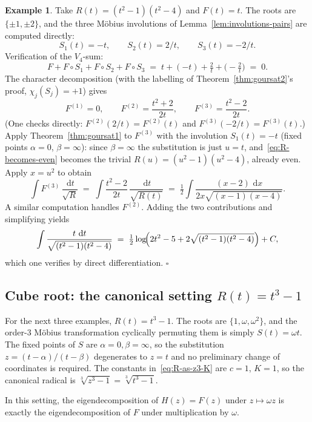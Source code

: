 \documentclass[11pt,a4paper]{article}
\theoremstyle{plain}
\theoremstyle{definition}
\newtheorem{example}[theorem]{Example}
\theoremstyle{remark}
\renewcommand{\d}{\,\mathrm{d}}
\begin{document}
\begin{example}\label{ex:goursat-basic}
Take $R(t) = (t^2-1)(t^2-4)$ and $F(t)=t$. The roots are $\{\pm 1, \pm 2\}$, and the three M\"obius involutions of Lemma~\ref{lem:involutions-pairs} are computed directly:
\[
  S_1(t) = -t,\qquad S_2(t) = 2/t,\qquad S_3(t) = -2/t.
\]
Verification of the $V_4$-sum:
\[
  F + F\!\circ\! S_1 + F\!\circ\! S_2 + F\!\circ\! S_3 \;=\; t + (-t) + \tfrac{2}{t} + \bigl(-\tfrac{2}{t}\bigr) \;=\; 0.
\]
The character decomposition (with the labelling of Theorem~\ref{thm:goursat2}'s proof, $\chi_j(S_j)=+1$) gives
\[
  F^{(1)} = 0,\qquad F^{(2)} = \frac{t^2+2}{2t},\qquad F^{(3)} = \frac{t^2-2}{2t}.
\]
(One checks directly: $F^{(2)}(2/t) = F^{(2)}(t)$ and $F^{(3)}(-2/t) = F^{(3)}(t)$.) Apply Theorem~\ref{thm:goursat1} to $F^{(3)}$ with the involution $S_1(t)=-t$ (fixed points $\alpha=0$, $\beta=\infty$): since $\beta=\infty$ the substitution is just $u=t$, and~\eqref{eq:R-becomes-even} becomes the trivial $R(u) = (u^2-1)(u^2-4)$, already even. Apply $x = u^2$ to obtain
\[
  \int F^{(3)}\,\frac{\d t}{\sqrt{R}} \;=\; \int \frac{t^2-2}{2t}\,\frac{\d t}{\sqrt{R(t)}}
  \;=\; \tfrac{1}{2}\int \frac{(x-2)\,\d x}{2x\sqrt{(x-1)(x-4)}}.
\]
A similar computation handles $F^{(2)}$. Adding the two contributions and simplifying yields
\[
  \int \frac{t\,\d t}{\sqrt{(t^2-1)(t^2-4)}} \;=\; \tfrac{1}{2}\log\!\Bigl(2t^2 - 5 + 2\sqrt{(t^2-1)(t^2-4)}\Bigr) + C,
\]
which one verifies by direct differentiation. \hfill$\square$
\end{example}

\subsection{Cube root: the canonical setting $R(t)=t^3-1$}

For the next three examples, $R(t)=t^3-1$. The roots are $\{1,\omega,\omega^2\}$, and the order-$3$ M\"obius transformation cyclically permuting them is simply $S(t) = \omega t$. The fixed points of $S$ are $\alpha=0,\beta=\infty$, so the substitution $z=(t-\alpha)/(t-\beta)$ degenerates to $z=t$ and no preliminary change of coordinates is required. The constants in~\eqref{eq:R-as-z3-K} are $c=1$, $K=1$, so the canonical radical is $\sqrt[3]{z^3-1}=\sqrt[3]{t^3-1}$.

In this setting, the eigendecomposition of $H(z)=F(z)$ under $z\mapsto\omega z$ is exactly the eigendecomposition of $F$ under multiplication by $\omega$.
\end{document}

